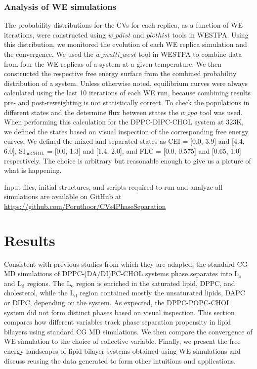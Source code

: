\documentclass{biophys-new}
\begin{document}
\subsubsection*{Analysis of WE simulations}
The probability distributions for the CVs for each replica, as a function of WE iterations, were constructed using $w\_pdist$ and $plothist$ tools in WESTPA.
Using this distribution, we monitored the evolution of each WE replica simulation and the convergence.
We used the $w\_multi\_west$ tool in WESTPA to combine data from four the WE replicas of a system at a given temperature.
We then constructed the respective free energy surface from the combined probability distribution of a system. Unless otherwise noted, equilibrium curves were always calculated using the last 10 iterations of each WE run, because combining results pre- and post-reweighting is not statistically correct.
To check the populations in different states and the determine flux between states the $w\_ipa$ tool was used.
When performing this calculation for the DPPC-DIPC-CHOL system at 323K, we defined the states based on visual inspection of the corresponding free energy curves. We defined the mixed and separated states as CEI = [0.0, 3.9] and [4.4, 6.0], $\text{SI}_{\text{noCHOL}}$ = [0.0, 1.3] and [1.4, 2.0], and FLC = [0.0, 0.575] and [0.65, 1.0] respectively.
The choice is arbitrary but reasonable enough to give us a picture of what is happening. 

Input files, initial structures, and scripts required to run and analyze all simulations are available on GitHub at \href{https://github.com/Poruthoor/CVs4PhaseSeparation}{https://github.com/Poruthoor/CVs4PhaseSeparation}

\section*{Results}

Consistent with previous studies from which they are adapted, the standard CG MD simulations of DPPC-(DA/DI)PC-CHOL systems phase separates into $\text{L}_{\text{o}}$ and $\text{L}_{\text{d}}$ regions.
The $\text{L}_{\text{o}}$ region is enriched in the saturated lipid, DPPC, and cholesterol, while the  
$\text{L}_{\text{d}}$ region contained mostly the unsaturated lipids, DAPC or DIPC, depending on the system.
As expected, the DPPC-POPC-CHOL system did not form distinct phases based on visual inspection.
This section compares how different variables track phase separation propensity in lipid bilayers using standard CG MD simulations.
We then compare the convergence of WE simulation to the choice of collective variable.
Finally, we present the free energy landscapes of lipid bilayer systems obtained using WE simulations and discuss reusing the data generated to form other intuitions and applications.
\end{document}
